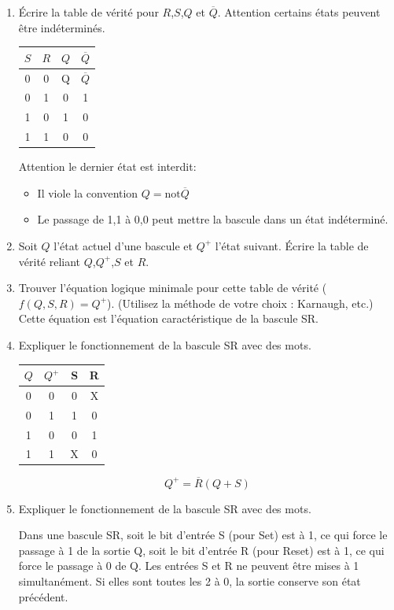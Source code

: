\documentclass[a4paper,10pt]{exam}
\begin{document}
\begin{enumerate}
  \item Écrire la table de vérité pour $R$,$S$,$Q$ et $\overline{Q}$. Attention
    certains états peuvent être indéterminés.
\begin{solution}
\begin{tabular}{cc|cc}
  $S$&$R$&$Q$&$\overline{Q}$\\
  \hline
  0 & 0  & Q & $\overline{Q}$ \\
  0 & 1  & 0 & 1 \\
  1 & 0  & 1 & 0 \\
  1 & 1  & 0 & 0
\end{tabular}

Attention le dernier état est interdit:
\begin{itemize}
  \item Il viole la convention $Q = \textrm{not} \overline{Q}$
  \item Le passage de 1,1 à 0,0 peut mettre la bascule dans un état indéterminé.
\end{itemize}
\end{solution}


  \item Soit $Q$ l'état actuel d'une bascule et $Q^{+}$ l'état suivant. Écrire
    la table de vérité reliant $Q$,$Q^{+}$,$S$ et $R$.

  \item Trouver l'équation logique minimale pour cette table de vérité
    ($f(Q,S,R) = Q^{+}$). (Utilisez la méthode de votre choix : Karnaugh, etc.)
    Cette équation est l'équation caractéristique de la bascule SR.

  \item Expliquer le fonctionnement de la bascule SR avec des mots.

\begin{solution}
\begin{tabular}{cc|cc}
  $Q$&$Q^{+}$&S&R\\
  \hline
  0  & 0     &0&X\\
  0  & 1     &1&0\\
  1  & 0     &0&1\\
  1  & 1     &X&0
\end{tabular}
$$ Q^{+} = \overline{R} (Q + S) $$
\end{solution}

  \item Expliquer le fonctionnement de la bascule SR avec des mots.

\begin{solution}
  Dans une bascule SR, soit le bit d'entr\'ee S (pour Set) est \`a 1, ce qui force le passage
  \`a 1 de la sortie Q, soit le bit d'entr\'ee R (pour Reset) est \`a 1, ce qui force le passage
  \`a 0 de Q. Les entr\'ees S et R ne peuvent \^etre mises \`a 1 simultan\'ement. Si elles sont
  toutes les 2 \`a 0, la sortie conserve son \'etat pr\'ec\'edent.
\end{solution}
\end{enumerate}
\end{document}
